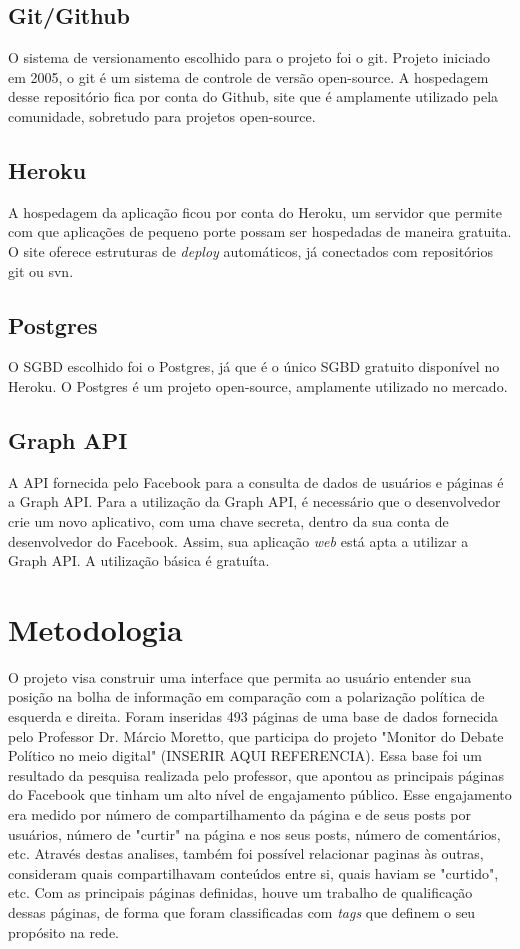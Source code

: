 \documentclass[
	12pt,				%
	oneside,			%
	a4paper,			%
	english,			%
	brazil				%
	]{abntex2ppgsi}
\begin{document}
\section{Git/Github}
O sistema de versionamento escolhido para o projeto foi o git. Projeto iniciado em 2005, o git é um sistema de controle de versão open-source. A hospedagem desse repositório fica por conta do Github, site que é amplamente utilizado pela comunidade, sobretudo para projetos open-source. 

\section{Heroku}
A hospedagem da aplicação ficou por conta do Heroku, um servidor que permite com que aplicações de pequeno porte possam ser hospedadas de maneira gratuita. O site oferece estruturas de \textit{deploy} automáticos, já conectados com repositórios git ou svn. 

\section{Postgres}
O SGBD escolhido foi o Postgres, já que é o único SGBD gratuito disponível no Heroku. O Postgres é um projeto open-source, amplamente utilizado no mercado. 

\section{Graph API}
A API fornecida pelo Facebook para a consulta de dados de usuários e páginas é a Graph API. Para a utilização da Graph API, é necessário que o desenvolvedor crie um novo aplicativo, com uma chave secreta, dentro da sua conta de desenvolvedor do Facebook. Assim, sua aplicação \textit{web} está apta a utilizar a Graph API. A utilização básica é gratuíta.

\chapter{Metodologia}
\label{metodologia}

O projeto visa construir uma interface que permita ao usuário entender sua posição na bolha de informação em comparação com a polarização política de esquerda e direita. Foram inseridas 493 páginas de uma base de dados fornecida pelo Professor Dr. Márcio Moretto, que participa do projeto "Monitor do Debate Político no meio digital" \cite{}(INSERIR AQUI REFERENCIA). Essa base foi um resultado da pesquisa realizada pelo professor, que apontou as principais páginas do Facebook que tinham um alto nível de engajamento público. Esse engajamento era medido por número de compartilhamento da página e de seus posts por usuários, número de "curtir" na página e nos seus posts, número de comentários, etc. Através destas analises, também foi possível relacionar paginas às outras, consideram quais compartilhavam conteúdos entre si, quais haviam se "curtido", etc. Com as principais páginas definidas, houve um trabalho de qualificação dessas páginas, de forma que foram classificadas com \textit{tags} que definem o seu propósito na rede. 
\end{document}
